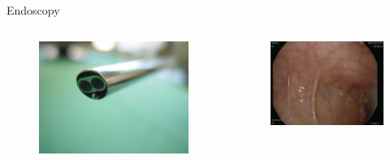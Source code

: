 \begin{frame}[c]{Endoscopy}


	\begin{columns}[t, onlytextwidth]
		\begin{column}{0.5\textwidth}

			\begin{figure}
				\includegraphics[width=.9\linewidth]{images/stereo1.jpg}
			\end{figure}
		\end{column}\begin{column}{0.5\textwidth}
			\begin{figure}
				\includegraphics[width=.9\linewidth]{images/sigma.png}
			\end{figure}
		\end{column}
	\end{columns}
\end{frame}

